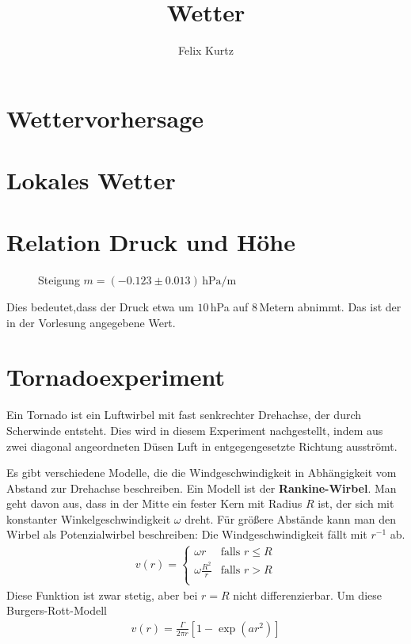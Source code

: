 \documentclass[12pt,a4paper,headinclude,bibtotoc]{scrartcl}
\begin{document}
\title{Wetter}
\author{Felix Kurtz}
\maketitle

\section{Wettervorhersage}

\section{Lokales Wetter}

\section{Relation Druck und Höhe}
\begin{figure}[!htb]
	\centering
	
	\caption{Steigung $m=(-0.123 \pm 0.013)\,\si{\hecto\pascal\per\meter}$}
\end{figure}

Dies bedeutet,dass der Druck etwa um $10\,$hPa auf $8\,$Metern abnimmt.
Das ist der in der Vorlesung angegebene Wert.

\section{Tornadoexperiment}
Ein Tornado ist ein Luftwirbel mit fast senkrechter Drehachse, der durch Scherwinde entsteht.
Dies wird in diesem Experiment nachgestellt, indem aus zwei diagonal angeordneten Düsen Luft in entgegengesetzte Richtung ausströmt.

Es gibt verschiedene Modelle, die die Windgeschwindigkeit in Abhängigkeit vom Abstand zur Drehachse beschreiben.
Ein Modell ist der \textbf{Rankine-Wirbel}.
Man geht davon aus, dass in der Mitte ein fester Kern mit Radius $R$ ist, der sich mit konstanter Winkelgeschwindigkeit $\omega$ dreht.
Für größere Abstände kann man den Wirbel als Potenzialwirbel beschreiben: Die Windgeschwindigkeit fällt mit $r^{-1}$ ab. 
\begin{align}
	v(r) = 
	\begin{cases}
		\omega r & \text{falls } r \leq R\\
		\omega \frac{R^2}{r} & \text{falls } r > R\\
	\end{cases}
\end{align}
Diese Funktion ist zwar stetig, aber bei $r=R$ nicht differenzierbar.
Um diese 
Burgers-Rott-Modell
\begin{align}
	v(r) = \frac{\Gamma}{2\pi r}\left[1-\exp\left(a r^2\right)\right]
\end{align}
\end{document}
